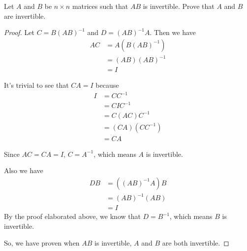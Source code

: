 \begin{homeworkProblem}
Let $A$ and $B$ be $n \times n$ matrices such that $AB$ is invertible. Prove that $A$ and $B$ are invertible.

\segline

\solution

\begin{proof}

Let $C = B(AB)^{-1}$ and $D = (AB)^{-1}A$. Then we have
\[
\begin{aligned}
    AC &= A(B(AB)^{-1}) \\
       &= (AB)(AB)^{-1} \\
       &= I
\end{aligned}
\]

It's trivial to see that $CA = I$ because
\[\begin{aligned}
    I &= CC^{-1} \\
      &= CIC^{-1} \\
      &= C(AC)C^{-1} \\
      &= (CA)(CC^{-1}) \\
      &= CA
\end{aligned}\]

Since $AC = CA = I$, $C = A^{-1}$, which means $A$ is invertible.

Also we have
\[\begin{aligned}
    DB &= ((AB)^{-1}A)B \\
       &= (AB)^{-1}(AB) \\
       &= I
\end{aligned}\]
By the proof elaborated above, we know that $D = B^{-1}$, which means $B$ is invertible.

So, we have proven when $AB$ is invertible, $A$ and $B$ are both invertible.
\end{proof}
\end{homeworkProblem}
